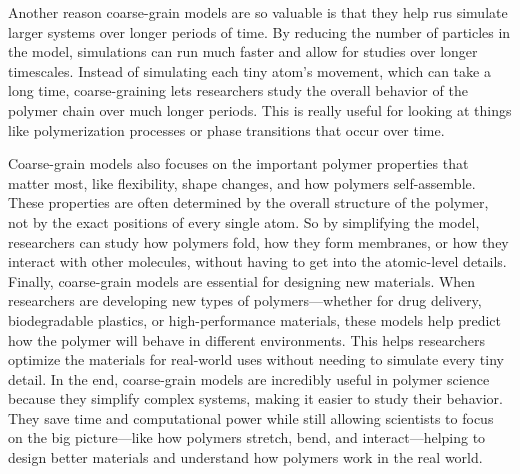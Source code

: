 \documentclass[12pt]{article}
\begin{document}
\begin{flushleft}
	
	Another reason coarse-grain models are so valuable is that they help rus simulate larger systems over longer periods of time. By reducing the number of particles in the model, simulations can run much faster and allow for studies over longer timescales. Instead of simulating each tiny atom’s movement, which can take a long time, coarse-graining lets researchers study the overall behavior of the polymer chain over much longer periods. This is really useful for looking at things like polymerization processes or phase transitions that occur over time.
	
	Coarse-grain models also focuses on the important polymer properties that matter most, like flexibility, shape changes, and how polymers self-assemble. These properties are often determined by the overall structure of the polymer, not by the exact positions of every single atom. So by simplifying the model, researchers can study how polymers fold, how they form membranes, or how they interact with other molecules, without having to get into the atomic-level details.\\
	
	Finally, coarse-grain models are essential for designing new materials. When researchers are developing new types of polymers—whether for drug delivery, biodegradable plastics, or high-performance materials, these models help predict how the polymer will behave in different environments. This helps researchers optimize the materials for real-world uses without needing to simulate every tiny detail.
	In the end, coarse-grain models are incredibly useful in polymer science because they simplify complex systems, making it easier to study their behavior. They save time and computational power while still allowing scientists to focus on the big picture—like how polymers stretch, bend, and interact—helping to design better materials and understand how polymers work in the real world.
	
\vspace{-1em} 

\end{flushleft}
\end{document}
